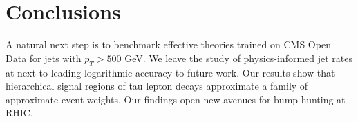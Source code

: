 \section{Conclusions}\label{sec:conclusions}

A natural next step is to benchmark effective theories trained on CMS
Open Data for jets with $p_T > 500$ GeV. We leave the study of
physics-informed jet rates at next-to-leading logarithmic accuracy to
future work. Our results show that hierarchical signal regions of tau
lepton decays approximate a family of approximate event weights. Our
findings open new avenues for bump hunting at RHIC.

